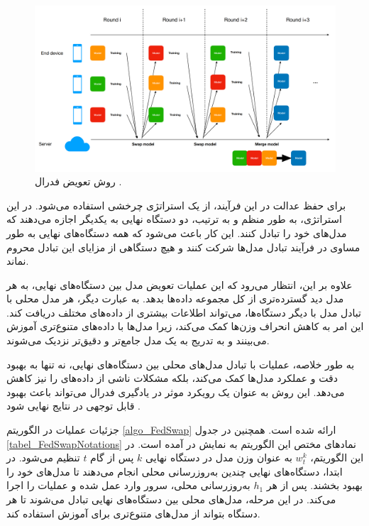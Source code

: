 \begin{figure}[b!]
	\centering
	\includegraphics[scale=0.2]{images/chap4/federated_swapping.png}%
	\caption{%
		روش تعویض فدرال
		\cite{chiu2020semisupervised}%
		.
	}
	\label{federated_swapping}
	\centering
\end{figure}


برای حفظ عدالت در این فرآیند، از یک استراتژی چرخشی استفاده می‌شود. در این استراتژی، به طور منظم و به ترتیب، دو دستگاه نهایی به یکدیگر اجازه می‌دهند که مدل‌های خود را تبادل کنند. این کار باعث می‌شود که همه دستگاه‌های نهایی به طور مساوی در فرآیند تبادل مدل‌ها شرکت کنند و هیچ دستگاهی از مزایای این تبادل محروم نماند.

علاوه بر این، انتظار می‌رود که این عملیات تعویض مدل بین دستگاه‌های نهایی، به هر مدل دید گسترده‌تری از کل مجموعه داده‌ها بدهد. به عبارت دیگر، هر مدل محلی با تبادل مدل با دیگر دستگاه‌ها، می‌تواند اطلاعات بیشتری از داده‌های مختلف دریافت کند. این امر به کاهش انحراف وزن‌ها کمک می‌کند، زیرا مدل‌ها با داده‌های متنوع‌تری آموزش می‌بینند و به تدریج به یک مدل جامع‌تر و دقیق‌تر نزدیک می‌شوند.

به طور خلاصه، عملیات
با تبادل مدل‌های محلی بین دستگاه‌های نهایی، نه تنها به بهبود دقت و عملکرد مدل‌ها کمک می‌کند، بلکه مشکلات ناشی از داده‌های
را نیز کاهش می‌دهد. این روش به عنوان یک رویکرد موثر در یادگیری فدرال می‌تواند باعث بهبود قابل توجهی در نتایج نهایی شود
\cite{chiu2020semisupervised}.


جزئیات عملیات
در الگوریتم
\ref{algo_FedSwap}
ارائه شده است.
همچنین در جدول
\ref{tabel_FedSwapNotations}
نمادهای مختص این الگوریتم به نمایش در آمده است.
در این الگوریتم،
$w^k_t$
به عنوان وزن مدل در دستگاه نهایی
$k$
پس از گام
$t$
تنظیم می‌شود. در ابتدا، دستگاه‌های نهایی چندین به‌روزرسانی محلی انجام می‌دهند تا مدل‌های خود را بهبود بخشند. پس از هر
$h_1$
به‌روزرسانی محلی، سرور وارد عمل شده و عملیات
را اجرا می‌کند. در این مرحله، مدل‌های محلی بین دستگاه‌های نهایی تبادل می‌شوند تا هر دستگاه بتواند از مدل‌های متنوع‌تری برای آموزش استفاده کند.

